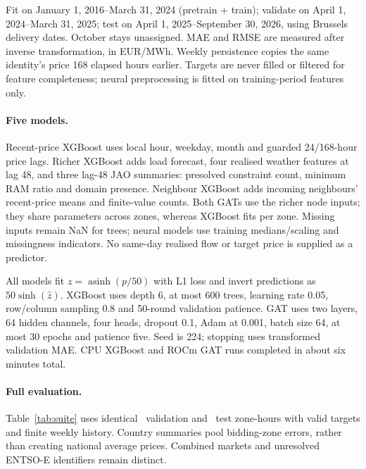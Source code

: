 \documentclass{article}
\begin{document}
Fit on January 1, 2016--March 31, 2024 (pretrain + train); validate on April 1,
2024--March 31, 2025; test on April 1, 2025--September 30, 2026, using Brussels
delivery dates. October stays unassigned. MAE and RMSE are measured after inverse
transformation, in EUR/MWh. Weekly persistence copies the same identity's price
168 elapsed hours earlier. Targets are never filled or filtered for feature
completeness; neural preprocessing is fitted on training-period features only.

\ifdefined\ControlledStudyComplete
\ControlledMethods
\else
\paragraph{Five models.}
Recent-price XGBoost uses local hour, weekday, month and guarded 24/168-hour
price lags. Richer XGBoost adds load forecast, four realised weather features
at lag 48, and three lag-48 JAO summaries: presolved constraint count, minimum
RAM ratio and domain presence. Neighbour XGBoost adds incoming neighbours'
recent-price means and finite-value counts. Both GATs use the richer node inputs;
they share parameters across zones, whereas XGBoost fits per zone. Missing inputs
remain NaN for trees; neural models use training medians/scaling and missingness
indicators. No same-day realised flow or target price is supplied as a predictor.

All models fit $z=\operatorname{asinh}(p/50)$ with L1 loss and invert predictions
as $50\sinh(\hat z)$. XGBoost uses depth 6, at most 600 trees, learning rate 0.05,
row/column sampling 0.8 and 50-round validation patience. GAT uses two layers,
64 hidden channels, four heads, dropout 0.1, Adam at 0.001, batch size 64,
at most 30 epochs and patience five. Seed is 224; stopping uses transformed
validation MAE. CPU XGBoost and ROCm GAT runs completed in about six minutes total.
\fi

\newpage
\ifdefined\ControlledStudyComplete
\ControlledResults
\else
\paragraph{Full evaluation.}
Table~\ref{tab:suite} uses identical \SuiteValHours\ validation and
\SuiteTestHours\ test zone-hours with valid targets and finite weekly history.
Country summaries pool bidding-zone errors, rather than creating national average
prices. Combined markets and unresolved ENTSO-E identifiers remain distinct.
\begin{table}[!ht]
\centering\small
\caption{Matched MAE (EUR/MWh), lower is better. One seed, 49 market identities.}
\label{tab:suite}
\end{table}
\end{document}

